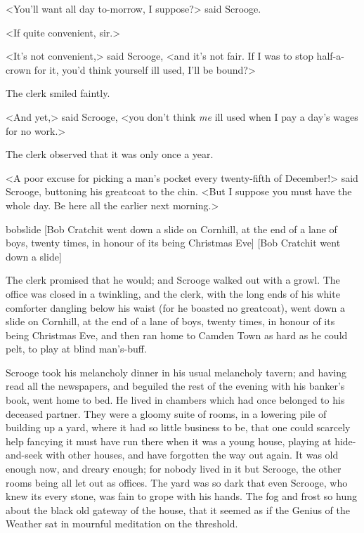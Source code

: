 <You'll want all day to-morrow, I suppose?> said Scrooge.

<If quite convenient, sir.>

<It's not convenient,> said Scrooge, <and it's not fair. If I was to stop half-a-crown for it, you'd think yourself ill used, I'll be bound?>

The clerk smiled faintly.

<And yet,> said Scrooge, <you don't think \textit{me} ill used when I pay a day's wages for no work.>

The clerk observed that it was only once a year.

<A poor excuse for picking a man's pocket every twenty-fifth of December!> said Scrooge, buttoning his greatcoat to the chin. <But I suppose you must have the whole day. Be here all the earlier next morning.>

\begin{colorbigpic}
	[\basicscale]
	{bobslide}
	[Bob Cratchit went down a slide on Cornhill, at the end of a lane of boys, twenty times, in honour of its being Christmas Eve]
	[Bob Cratchit went down a slide]
\end{colorbigpic}


The clerk promised that he would; and Scrooge walked out with a growl. The office was closed in a twinkling, and the clerk, with the long ends of his white comforter dangling below his waist (for he boasted no greatcoat), went down a slide on Cornhill, at the end of a lane of boys, twenty times, in honour of its being Christmas Eve, and then ran home to Camden Town as hard as he could pelt, to play at blind man's-buff.

Scrooge took his melancholy dinner in his usual melancholy tavern; and having read all the newspapers, and beguiled the rest of the evening with his banker's book, went home to bed. He lived in chambers which had once belonged to his deceased partner. They were a gloomy suite of rooms, in a lowering pile of building up a yard, where it had so little business to be, that one could scarcely help fancying it must have run there when it was a young house, playing at hide-and-seek with other houses, and have forgotten the way out again. It was old enough now, and dreary enough; for nobody lived in it but Scrooge, the other rooms being all let out as offices. The yard was so dark that even Scrooge, who knew its every stone, was fain to grope with his hands. The fog and frost so hung about the black old gateway of the house, that it seemed as if the Genius of the Weather sat in mournful meditation on the threshold.

